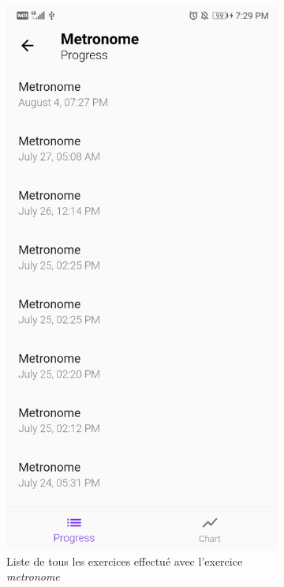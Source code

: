 \begin{appendices}
\begin{landscape}
\begin{figure}[h]
\begin{subfigure}{.25\textwidth}
    \includegraphics[width=.75\linewidth]{content/imgs/screen7.jpg}
    \caption{Liste de tous les exercices effectué avec l'exercice \textit{metronome}}
  \end{subfigure}%
  \begin{subfigure}{.25\textwidth}
    \centering

\end{subfigure}
\end{figure}
\end{landscape}
\end{appendices}
